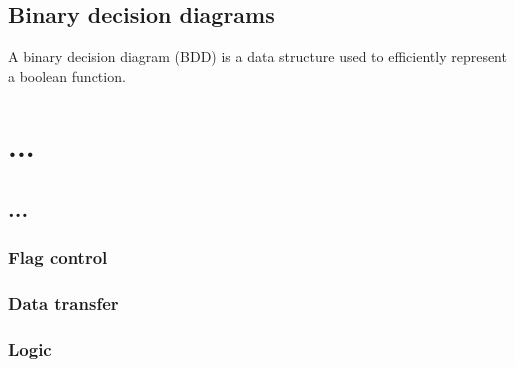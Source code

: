\documentclass[a4paper,11pt]{kth-mag}
\begin{document}
\cite{crick_thesis}

\section{Binary decision diagrams}

A binary decision diagram (BDD) is a data structure used to efficiently represent a boolean function.




\cite{lee59}
\cite{akers78}
\cite{bryant86}
\cite{minato90}

\chapter{...}


\section{...}

\subsection{Flag control}


\subsection{Data transfer}


\subsection{Logic}
\end{document}
